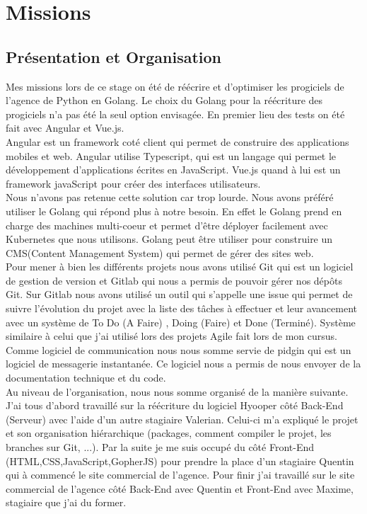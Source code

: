 \documentclass[12pt,a4paper]{report}
\begin{document}
\chapter[Missions]{Missions}

\section{Présentation et Organisation}
Mes missions lors de ce stage on été de réécrire et d'optimiser les progiciels de l'agence de Python en Golang. Le choix du Golang pour la réécriture des progiciels n'a pas été la seul option envisagée. En premier lieu des tests on été fait avec Angular et Vue.js.\\ 

Angular est un framework coté client qui permet de construire des applications mobiles et web. Angular utilise Typescript, qui est un langage qui permet le développement d'applications écrites en JavaScript. Vue.js quand à lui est un framework javaScript pour créer des interfaces utilisateurs.\\

Nous n'avons pas retenue cette solution car trop lourde. Nous avons préféré utiliser le Golang qui répond plus à notre besoin. En effet le Golang prend en charge des machines multi-coeur et permet d'être déployer facilement avec Kubernetes que nous utilisons. Golang peut être utiliser pour construire un CMS(Content Management System) qui permet de gérer des sites web.\\

Pour mener à bien les différents projets nous avons utilisé Git qui est un logiciel de gestion de version et Gitlab qui nous a permis de pouvoir gérer nos dépôts Git. Sur Gitlab nous avons utilisé un outil qui s'appelle une issue qui permet de suivre l'évolution du projet avec la liste des tâches à effectuer et leur avancement avec un système de To Do (A Faire) , Doing (Faire) et Done (Terminé). Système similaire à celui que j'ai utilisé lors des projets Agile fait lors de mon cursus.\\

Comme logiciel de communication nous nous somme servie de pidgin qui est un logiciel de messagerie instantanée. Ce logiciel nous a permis de nous envoyer de la documentation technique et du code.\\
\newpage
Au niveau de l'organisation, nous nous somme organisé de la manière  suivante. J'ai tous d'abord travaillé sur la réécriture du logiciel Hyooper côté Back-End (Serveur)  avec l'aide d'un autre stagiaire Valerian. Celui-ci m'a expliqué le projet et son organisation hiérarchique (packages, comment compiler le projet, les branches sur Git, ...). Par la suite je me suis occupé du côté Front-End (HTML,CSS,JavaScript,GopherJS) pour prendre la place d'un stagiaire Quentin qui à commencé le site commercial de l'agence. Pour finir j'ai travaillé sur le site commercial de l'agence côté Back-End avec Quentin  et Front-End avec Maxime, stagiaire que j'ai du former.\\
\end{document}
